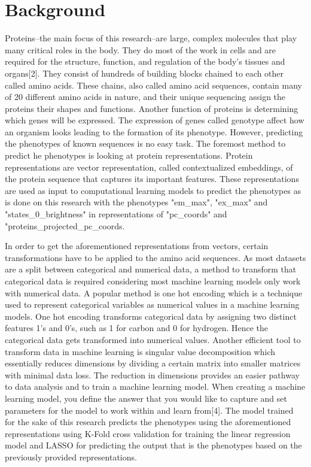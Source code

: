 \documentclass{article}
\begin{document}
\section{Background}
Proteins--the main focus of this research--are large, complex molecules that play many critical roles in the body. They do most of the work in cells and are required for the structure, function, and regulation of the body’s tissues and organs[2]. They consist of hundreds of building blocks chained to each other called amino acids. These chains, also called amino acid sequences, contain many of 20 different amino acids in nature, and their unique sequencing assign the proteins their shapes and functions. Another function of proteins is determining which genes will be expressed. The expression of genes called genotype affect how an organism looks leading to the formation of its phenotype. However, predicting the phenotypes of known sequences is no easy task. The foremost method to predict he phenotypes is looking at protein representations. Protein representations are vector representation, called contextualized embeddings, of the protein sequence that captures its important features. These representations are used as input to computational learning models to predict the phenotypes as is done on this research with the phenotypes "em\_max", "ex\_max" and "states\_0\_brightness" in representations of "pc\_coords" and "proteins\_projected\_pc\_coords.\par
In order to get the aforementioned representations from vectors, certain transformations have to be applied to the amino acid sequences. As most datasets are a split between categorical and numerical data, a method to transform that categorical data is required considering most machine learning models only work with numerical data. A popular method is one hot encoding which is a technique used to represent categorical variables as numerical values in a machine learning models. One hot encoding transforms categorical data by assigning two distinct features 1's and 0's, such as 1 for carbon and 0 for hydrogen. Hence the categorical data gets transformed into numerical values. Another efficient tool to transform data in machine learning is singular value decomposition which essentially reduces dimensions by dividing a certain matrix into smaller matrices with minimal data loss. The reduction in dimensions provides an easier pathway to data analysis and to train a machine learning model. When creating a machine learning model, you define the answer that you would like to capture and set parameters for the model to work within and learn from[4]. The model trained for the sake of this research predicts the phenotypes using the aforementioned representations using K-Fold cross validation for training the linear regression model and LASSO for predicting the output that is the phenotypes based on the previously provided representations.\par
\end{document}
